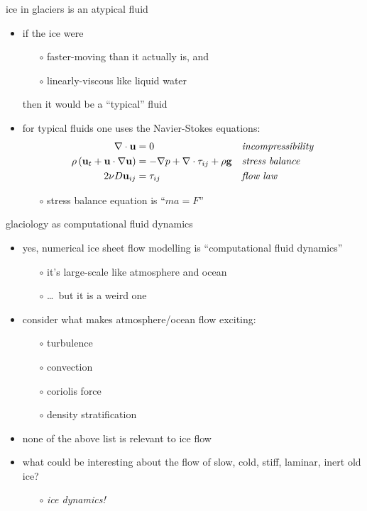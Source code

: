 \documentclass[10pt,dvipsnames]{beamer}
\begin{document}
\begin{frame}{ice in glaciers is an atypical fluid}

\begin{itemize}
\item if the ice were
  \begin{itemize}
  \item[$\circ$] faster-moving than it actually is, and
  \item[$\circ$] linearly-viscous like liquid water
  \end{itemize}

  then it would be a ``typical'' fluid

\bigskip
\item for typical fluids one uses the Navier-Stokes equations:
\begin{align*}
\nabla \cdot \mathbf{u} &= 0 &&\text{\emph{incompressibility}} \\
\rho \left(\mathbf{u}_t + \mathbf{u}\cdot\nabla \mathbf{u}\right) &= -\nabla p + \nabla \cdot \tau_{ij} + \rho \mathbf{g} &&\text{\emph{stress balance}} \\
2 \nu D\mathbf{u}_{ij} &= \tau_{ij} &&\text{\emph{flow law}}
\end{align*}

\medskip
    \begin{itemize}
    \item[$\circ$] stress balance equation is ``$m a = F$''
    \end{itemize}
\end{itemize}
\end{frame}


\begin{frame}{glaciology as computational fluid dynamics}

\begin{itemize}
\item \alert{yes}, numerical ice sheet flow modelling is ``computational fluid dynamics''
  \begin{itemize}
  \item[$\circ$] it's large-scale like atmosphere and ocean
  \item[$\circ$] \dots\, but it is a weird one
  \end{itemize}
\item consider what makes atmosphere/ocean flow exciting:
  \begin{itemize}
  \item[$\circ$] turbulence
  \item[$\circ$] convection
  \item[$\circ$] coriolis force
  \item[$\circ$] density stratification
  \end{itemize}
\item none of the above list is relevant to ice flow
\item what could be interesting about the flow of slow, cold, stiff, laminar, inert old ice?
  \begin{itemize}
  \item[$\circ$] \emph{ice dynamics!}
  \end{itemize}
\end{itemize}
\end{frame}
\end{document}
